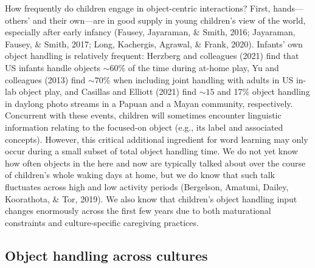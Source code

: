 \documentclass[10pt, letterpaper]{article}
\begin{document}
How frequently do children engage in object-centric interactions? First,
hands---others' and their own---are in good supply in young children's
view of the world, especially after early infancy (Fausey, Jayaraman, \&
Smith, 2016; Jayaraman, Fausey, \& Smith, 2017; Long, Kachergis,
Agrawal, \& Frank, 2020). Infants' own object handling is relatively
frequent: Herzberg and colleagues (2021) find that US infants handle
objects \({\sim}60\%\) of the time during at-home play, Yu and
colleagues (2013) find \({\sim}70\%\) when including joint handling with
adults in US in-lab object play, and Casillas and Elliott (2021) find
\({\sim}15\) and 17\% object handling in daylong photo streams in a
Papuan and a Mayan community, respectively. Concurrent with these
events, children will sometimes encounter linguistic information
relating to the focused-on object (e.g., its label and associated
concepts). However, this critical additional ingredient for word
learning may only occur during a small subset of total object handling
time. We do not yet know how often objects in the here and now are
typically talked about over the course of children's whole waking days
at home, but we do know that such talk fluctuates across high and low
activity periods (Bergelson, Amatuni, Dailey, Koorathota, \& Tor, 2019).
We also know that children's object handling input changes enormously
across the first few years due to both maturational constraints and
culture-specific caregiving practices.

\hypertarget{object-handling-across-cultures}{%
\subsection{Object handling across
cultures}\label{object-handling-across-cultures}}
\end{document}
